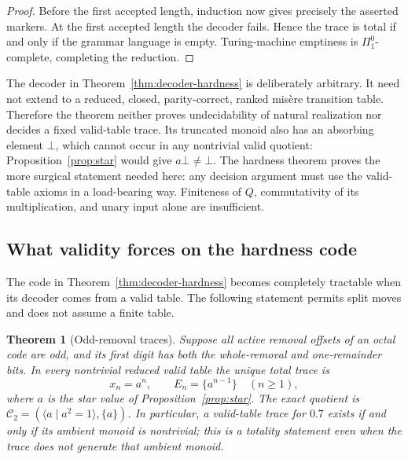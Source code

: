 \documentclass[11pt]{article}
\newtheorem{theorem}{Theorem}[section]
\theoremstyle{definition}
\theoremstyle{remark}
\begin{document}
\begin{proof}
Before the first accepted length, induction now gives precisely the asserted
markers.  At the first accepted length the decoder fails.  Hence the trace is
total if and only if the grammar language is empty.  Turing-machine emptiness
is $\Pi^0_1$-complete, completing the reduction.
\end{proof}

The decoder in Theorem~\ref{thm:decoder-hardness} is deliberately arbitrary.
It need not extend to a reduced, closed, parity-correct, ranked mis\`ere
transition table.  Therefore the theorem neither proves undecidability of
natural realization nor decides a fixed valid-table trace.  Its truncated monoid also has an absorbing element $\bot$, which cannot
occur in any nontrivial valid quotient: Proposition~\ref{prop:star} would
give $a\bot\ne\bot$.  The hardness theorem proves the
more surgical statement needed here: any decision argument must use the
valid-table axioms in a load-bearing way.  Finiteness of $Q$, commutativity of
its multiplication, and unary input alone are insufficient.

\subsection{What validity forces on the hardness code}\label{sec:parity-traces}

The code in Theorem~\ref{thm:decoder-hardness} becomes completely tractable
when its decoder comes from a valid table.  The following statement permits
split moves and does not assume a finite table.

\begin{theorem}[Odd-removal traces]\label{thm:odd-removal}
Suppose all active removal offsets of an octal code are odd, and its first
digit has both the whole-removal and one-remainder bits.  In every nontrivial
reduced valid table the unique total trace is
\[
 x_n=a^n,\qquad E_n=\{a^{n-1}\}\quad(n\ge1),
\]
where $a$ is the star value of Proposition~\ref{prop:star}.  The exact
quotient is
$\mathcal C_2=(\langle a\mid a^2=1\rangle,\{a\})$.
In particular, a valid-table trace for $0.7$ exists if and only if its
ambient monoid is nontrivial; this is a totality statement even when the
trace does not generate that ambient monoid.
\end{theorem}
\end{document}
